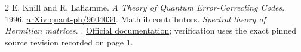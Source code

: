 \documentclass[10pt,letterpaper]{article}
\begin{document}
\begin{thebibliography}{2}\small
{} E. Knill and R. Laflamme. \emph{A Theory of Quantum Error-Correcting Codes}. 1996. \href{https://arxiv.org/abs/quant-ph/9604034}{arXiv:quant-ph/9604034}.
 Mathlib contributors. \emph{Spectral theory of Hermitian matrices}. . \href{https://leanprover-community.github.io/mathlib4_docs/Mathlib/Analysis/Matrix/Spectrum.html}{Official documentation}; verification uses the exact pinned source revision recorded on page 1.
\end{thebibliography}
\end{document}
